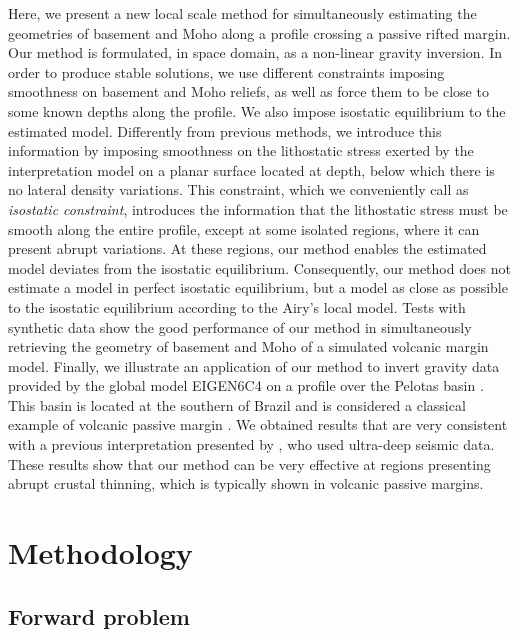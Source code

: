 \documentclass[manuscript]{geophysics}
\begin{document}
Here, we present a new local scale method for simultaneously estimating the geometries
of basement and Moho along a profile crossing a passive rifted margin.
Our method is formulated, in space domain, as a non-linear gravity inversion.
In order to produce stable solutions,
we use different constraints imposing smoothness on basement and Moho reliefs, 
as well as force them to be close to some known depths along the profile. 
We also impose isostatic equilibrium to the estimated model. 
Differently from previous methods, we introduce this information by
imposing smoothness on the lithostatic stress exerted by the interpretation 
model on a planar surface located at depth, below which there is no lateral
density variations.
This constraint, which we conveniently call as \textit{isostatic constraint},
introduces the information that the lithostatic stress must be smooth along the 
entire profile, except at some isolated regions, where it can present abrupt variations.
At these regions, our method enables the estimated model deviates from the 
isostatic equilibrium.
Consequently, our method does not estimate a model in perfect isostatic equilibrium, 
but a model as close as possible to the isostatic equilibrium according to the
Airy's local model. 
Tests with synthetic data show the good performance of our method in simultaneously
retrieving the geometry of basement and Moho of a simulated volcanic margin
model. Finally, we illustrate an application of our method to invert 
gravity data provided by the global model EIGEN6C4 \citep{forste2014} 
on a profile over the Pelotas basin \citep{stica-etal2014}. This basin is
located at the southern of Brazil and is considered a classical example 
of volcanic passive margin \citep{geoffroy2005}. 
We obtained results that are very consistent with a previous
interpretation presented by \citet{zalan2015}, who used ultra-deep seismic data.
These results show that our method can be very effective at regions
presenting abrupt crustal thinning, which is typically shown in volcanic passive margins.


\section{Methodology}


\subsection{Forward problem}
\end{document}
